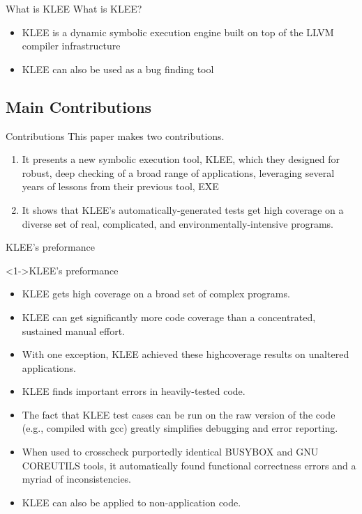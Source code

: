 \documentclass[9pt,aspectratio=43,mathserif,table]{beamer}
\begin{document}
\begin{frame}{What is KLEE}
	What is KLEE?
	\begin{itemize}
		\item<0-> KLEE is a dynamic symbolic execution engine built on top of the LLVM compiler infrastructure
		\item<0-> KLEE can also be used as a bug finding tool
	\end{itemize}
\end{frame}

\subsection{Main Contributions}
\begin{frame}{Contributions}
	This paper makes two contributions.
	\begin{enumerate}
		\item<0-> It presents a new symbolic execution tool, KLEE, which they designed for robust,
		      deep checking of a broad range of applications, leveraging several years of lessons from their
		      previous tool, EXE
		\item<0-> It shows that KLEE’s automatically-generated tests get high coverage on a diverse set of real,
		      complicated, and environmentally-intensive programs.
	\end{enumerate}
\end{frame}

\begin{frame}{KLEE’s preformance}
	\begin{block}<1->{KLEE's preformance}
		\begin{itemize}
			\item<1->  KLEE gets high coverage on a broad set of complex programs.
			\item<1->  KLEE can get significantly more code coverage than a concentrated, sustained manual effort.
			\item<1->  With one exception, KLEE achieved these highcoverage results on unaltered applications.
			\item<1->  KLEE finds important errors in heavily-tested code.
			\item<1->  The fact that KLEE test cases can be run on the raw version of the code (e.g., compiled with gcc) greatly
			      simplifies debugging and error reporting.
			\item<1->  When used to crosscheck purportedly identical BUSYBOX and GNU COREUTILS tools,
			      it automatically found functional correctness errors and a myriad of inconsistencies.
			\item<1->  KLEE can also be applied to non-application code.
		\end{itemize}
	\end{block}
\end{frame}
\end{document}
